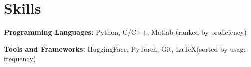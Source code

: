 \documentclass{resume}
\begin{document}

\section{Skills}
  \textbf{Programming Languages:} \small Python, C/C++, Matlab (ranked by proficiency)

  \textbf{Tools and Frameworks:} \small HuggingFace, PyTorch, Git, \LaTeX (sorted by usage frequency) 
\end{document}
